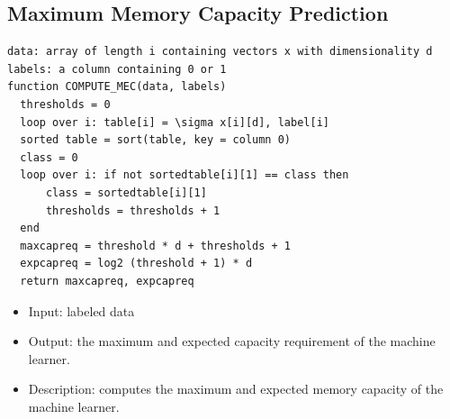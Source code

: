 \documentclass[12pt]{article}
\numberwithin{figure}{section} %
\begin{document}
\subsection{Maximum Memory Capacity Prediction}
\label{subsection:Maximum Memory Capacity Prediction}
\begin{lstlisting}
data: array of length i containing vectors x with dimensionality d 
labels: a column containing 0 or 1
function COMPUTE_MEC(data, labels)
  thresholds = 0
  loop over i: table[i] = \sigma x[i][d], label[i]
  sorted table = sort(table, key = column 0) 
  class = 0
  loop over i: if not sortedtable[i][1] == class then 
      class = sortedtable[i][1]
      thresholds = thresholds + 1
  end
  maxcapreq = threshold * d + thresholds + 1
  expcapreq = log2 (threshold + 1) * d
  return maxcapreq, expcapreq
\end{lstlisting}
\vspace{-1.5em}
\begin{itemize}[leftmargin = 0.5cm, topsep=0pt,itemsep=-1ex,partopsep=1ex,parsep=1ex]
\item Input: labeled data 
\item Output: the maximum and expected capacity requirement of the machine learner. 
\item Description: computes the maximum and expected memory capacity of the machine learner.  
\end{itemize}
\end{document}

